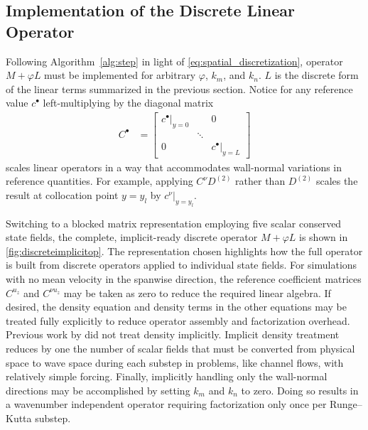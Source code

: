 \subsection{Implementation of the Discrete Linear Operator}
\label{sec:solutionimplicitoperator}

Following Algorithm~\ref{alg:step} in light of
\eqref{eq:spatial_discretization}, operator $M+\varphi{}L$ must be implemented for
arbitrary $\varphi$, $k_m$, and $k_n$. $L$ is the discrete form of the linear
terms summarized in the previous section.  Notice for any reference value
$c^{\bullet}$ left-multiplying by the diagonal matrix
\begin{align}
  C^{\bullet} &= \begin{bmatrix}
   \left.c^{\bullet}\right|_{y=0} &        & 0 \\
                                  & \ddots &    \\
   0                              &        & \left.c^{\bullet}\right|_{y=L}
   \end{bmatrix}
\end{align}
scales linear operators in a way that accommodates wall-normal variations in
reference quantities.  For example, applying $C^{\nu}D^{(2)}$ rather than
$D^{(2)}$ scales the result at collocation point $y=y_l$ by
$\left.c^{\nu}\right|_{y=y_l}$.

Switching to a blocked matrix representation employing five scalar conserved
state fields, the complete, implicit-ready discrete operator $M+\varphi{}L$ is
shown in \autoref{fig:discreteimplicitop}.  The representation chosen
highlights how the full operator is built from discrete operators applied to
individual state fields.
%
%
For simulations with no mean velocity in the spanwise
direction, the reference coefficient matrices $C^{u_z}$ and $C^{\nu{}u_z}$ may
be taken as zero to reduce the required linear algebra.
%
If desired, the density equation and density terms in the other equations may be
treated fully explicitly to reduce operator assembly and factorization overhead.
Previous work by \citet{Guarini1998} did not treat density implicitly.
Implicit density treatment reduces by one the number of scalar fields that
must be converted from physical space to wave space during each substep in
problems, like channel flows, with relatively simple forcing.
%
Finally, implicitly handling only the wall-normal directions may be accomplished
by setting $k_{m}$ and $k_{n}$ to zero.  Doing so results in a wavenumber
independent operator requiring factorization only once per Runge--Kutta substep.

